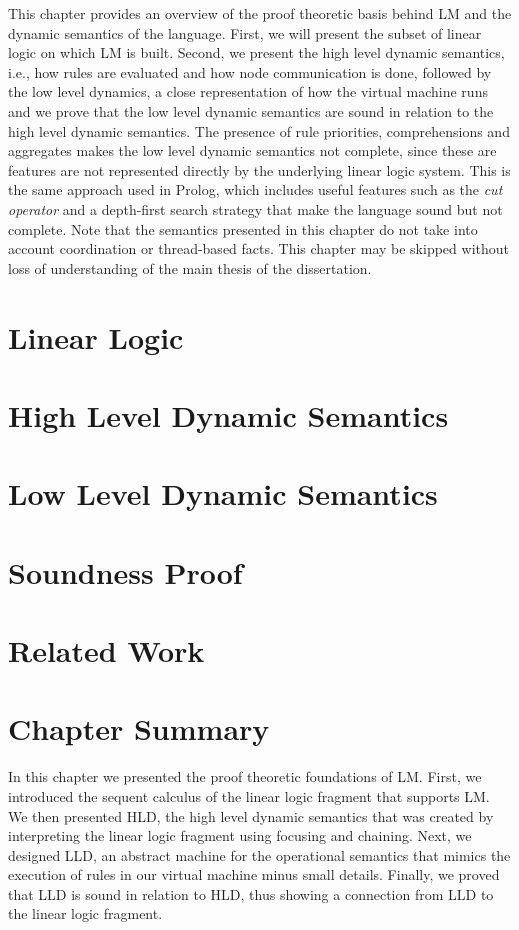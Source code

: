 This chapter provides an overview of the proof theoretic basis behind LM and the
dynamic semantics of the language. First, we will present the subset of linear
logic on which LM is built. Second, we present the high level dynamic semantics,
i.e., how rules are evaluated and how node communication is done, followed by
the low level dynamics, a close representation of how the virtual machine runs
and we prove that the low level dynamic semantics are sound in relation to the
high level dynamic semantics. The presence of rule priorities, comprehensions
and aggregates makes the low level dynamic semantics not complete, since these
are features are not represented directly by the underlying linear logic system.
This is the same approach used in Prolog, which includes useful features such as
the \emph{cut operator} and a depth-first search strategy that make the language
sound but not complete. Note that the semantics presented in this chapter do not
take into account coordination or thread-based facts. This chapter may be
skipped without loss of understanding of the main thesis of the dissertation.

\section{Linear Logic}


\section{High Level Dynamic Semantics}



\section{Low Level Dynamic Semantics}

\section{Soundness Proof}

\section{Related Work}

\section{Chapter Summary}

In this chapter we presented the proof theoretic foundations of LM.  First, we
introduced the sequent calculus of the linear logic fragment that supports LM. We then
presented HLD, the high level dynamic semantics that was created by interpreting
the linear logic fragment using focusing and chaining. Next, we designed LLD,
an abstract machine for the operational semantics that mimics the execution of
rules in our virtual machine minus small details.  Finally, we proved that LLD is sound
in relation to HLD, thus showing a connection from LLD to the linear logic
fragment.

